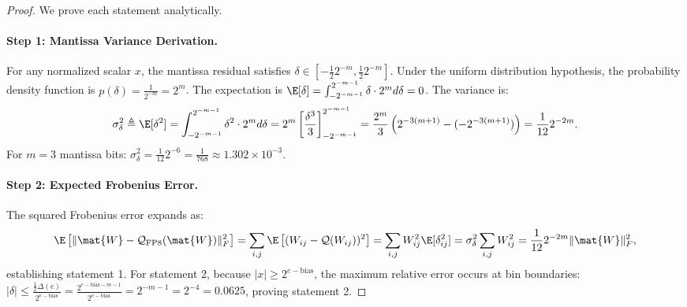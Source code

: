 \begin{proof}
We prove each statement analytically.

\paragraph{Step 1: Mantissa Variance Derivation.}
For any normalized scalar $x$, the mantissa residual satisfies $\delta \in [-\frac{1}{2} 2^{-m}, \frac{1}{2} 2^{-m}]$. Under the uniform distribution hypothesis, the probability density function is $p(\delta) = \frac{1}{2^{-m}} = 2^m$. The expectation is $\E[\delta] = \int_{-2^{-m-1}}^{2^{-m-1}} \delta \cdot 2^m d\delta = 0$. The variance is:
\begin{equation}
\sigma_\delta^2 \triangleq \E[\delta^2] = \int_{-2^{-m-1}}^{2^{-m-1}} \delta^2 \cdot 2^m d\delta = 2^m \left[ \frac{\delta^3}{3} \right]_{-2^{-m-1}}^{2^{-m-1}} = \frac{2^m}{3} \left( 2^{-3(m+1)} - (-2^{-3(m+1)}) \right) = \frac{1}{12} 2^{-2m}.
\end{equation}
For $m=3$ mantissa bits: $\sigma_\delta^2 = \frac{1}{12} 2^{-6} = \frac{1}{768} \approx 1.302 \times 10^{-3}$.

\paragraph{Step 2: Expected Frobenius Error.}
The squared Frobenius error expands as:
\begin{equation}
\E\left[ \| \mat{W} - \mathcal{Q}_{\text{FP8}}(\mat{W}) \|_F^2 \right] = \sum_{i,j} \E\left[ (W_{ij} - \mathcal{Q}(W_{ij}))^2 \right] = \sum_{i,j} W_{ij}^2 \E[\delta_{ij}^2] = \sigma_\delta^2 \sum_{i,j} W_{ij}^2 = \frac{1}{12} 2^{-2m} \| \mat{W} \|_F^2,
\end{equation}
establishing statement 1. For statement 2, because $|x| \ge 2^{e - \text{bias}}$, the maximum relative error occurs at bin boundaries: $|\delta| \le \frac{\frac{1}{2} \Delta(e)}{2^{e - \text{bias}}} = \frac{2^{e - \text{bias} - m - 1}}{2^{e - \text{bias}}} = 2^{-m-1} = 2^{-4} = 0.0625$, proving statement 2.


\end{proof}
